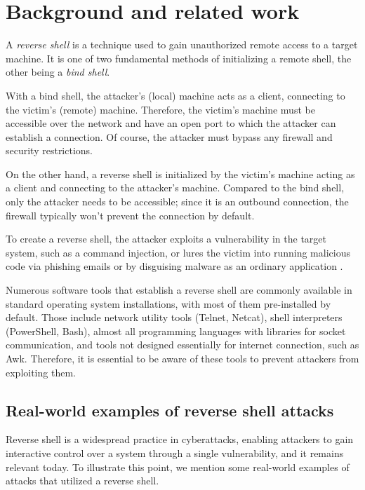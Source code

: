 \newcommand{\imagepathone}[1]{chapters/chapter1/images/#1}

\chapter{Background and related work}

\label{chap:background}


A \textit{reverse shell} is a technique used to gain unauthorized remote access to a target machine. It is one of two fundamental methods of initializing a remote shell, the other being a \textit{bind shell}.

With a bind shell, the attacker's (local) machine acts as a client, connecting to the victim's (remote) machine. Therefore, the victim's machine must be accessible over the network and have an open port to which the attacker can establish a connection. Of course, the attacker must bypass any firewall and security restrictions.

On the other hand, a reverse shell is initialized by the victim's machine acting as a client and connecting to the attacker's machine. Compared to the bind shell, only the attacker needs to be accessible; since it is an outbound connection, the firewall typically won't prevent the connection by default.

To create a reverse shell, the attacker exploits a vulnerability in the target system, such as a command injection, or lures the victim into running malicious code via phishing emails or by disguising malware as an ordinary application \cite{imperva}.

Numerous software tools that establish a reverse shell are commonly available in standard operating system installations, with most of them pre-installed by default. Those include network utility tools (Telnet, Netcat), shell interpreters (PowerShell, Bash), almost all programming languages with libraries for socket communication, and tools not designed essentially for internet connection, such as Awk. Therefore, it is essential to be aware of these tools to prevent attackers from exploiting them.


\section{Real-world examples of reverse shell attacks}

Reverse shell is a widespread practice in cyberattacks, enabling attackers to gain interactive control over a system through a single vulnerability, and it remains relevant today. To illustrate this point, we mention some real-world examples of attacks that utilized a reverse shell. 


